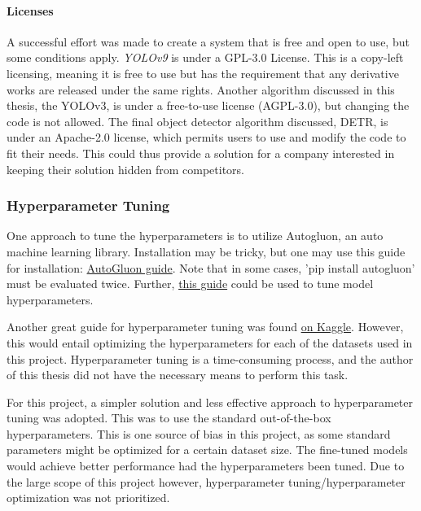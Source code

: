 \paragraph{Licenses}
A successful effort was made to create a system that is free and open to use, but some conditions apply. \textit{YOLOv9} is under a GPL-3.0 License. This is a copy-left licensing, meaning it is free to use but has the requirement that any derivative works are released under the same rights. Another algorithm discussed in this thesis, the YOLOv3, is under a free-to-use license (AGPL-3.0), but changing the code is not allowed. The final object detector algorithm discussed, DETR, is under an Apache-2.0 license, which permits users to use and modify the code to fit their needs. This could thus provide a solution for a company interested in keeping their solution hidden from competitors.

\subsubsection{Hyperparameter Tuning}
\label{sec:hyperparameter_tuning}
One approach to tune the hyperparameters is to utilize Autogluon, an auto machine learning library. Installation may be tricky, but one may use this guide for installation: \href{https://auto.gluon.ai/stable/install.html}{AutoGluon guide}. Note that in some cases, 'pip install autogluon' must be evaluated twice. Further, \href{https://auto.gluon.ai/scoredebugweight/tutorials/course/script.html}{this guide} could be used to tune model hyperparameters. 

Another great guide for hyperparameter tuning was found \href{https://www.kaggle.com/code/biditsadhukhan/yolo-v9-hyperparameter-tuning-freezing-layers}{on Kaggle}. However, this would entail optimizing the hyperparameters for each of the datasets used in this project. Hyperparameter tuning is a time-consuming process, and the author of this thesis did not have the necessary means to perform this task.

For this project, a simpler solution and less effective approach to hyperparameter tuning was adopted. This was to use the standard out-of-the-box hyperparameters. This is one source of bias in this project, as some standard parameters might be optimized for a certain dataset size. The fine-tuned models would achieve better performance had the hyperparameters been tuned. Due to the large scope of this project however, hyperparameter tuning/hyperparameter optimization was not prioritized.  

